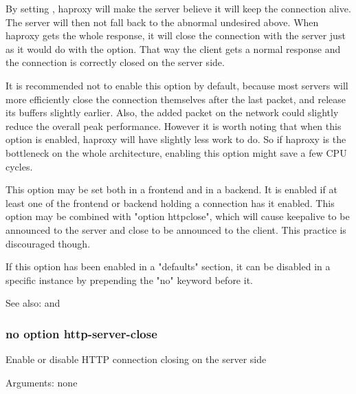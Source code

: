   By setting , haproxy will make the server
  believe it will keep the connection alive. The server will then not fall back
  to the abnormal undesired above. When haproxy gets the whole response, it
  will close the connection with the server just as it would do with the
   option. That way the client gets a normal response and the
  connection is correctly closed on the server side.

  It is recommended not to enable this option by default, because most servers
  will more efficiently close the connection themselves after the last packet,
  and release its buffers slightly earlier. Also, the added packet on the
  network could slightly reduce the overall peak performance. However it is
  worth noting that when this option is enabled, haproxy will have slightly
  less work to do. So if haproxy is the bottleneck on the whole architecture,
  enabling this option might save a few CPU cycles.

  This option may be set both in a frontend and in a backend. It is enabled if
  at least one of the frontend or backend holding a connection has it enabled.
  This option may be combined with "option httpclose", which will cause
  keepalive to be announced to the server and close to be announced to the
  client. This practice is discouraged though.

  If this option has been enabled in a "defaults" section, it can be disabled
  in a specific instance by prepending the "no" keyword before it.


See also:  and 

\subsubsection[http-server-close]{}
\subsubsection*{no option http-server-close}


  Enable or disable HTTP connection closing on the server side


  Arguments: none

